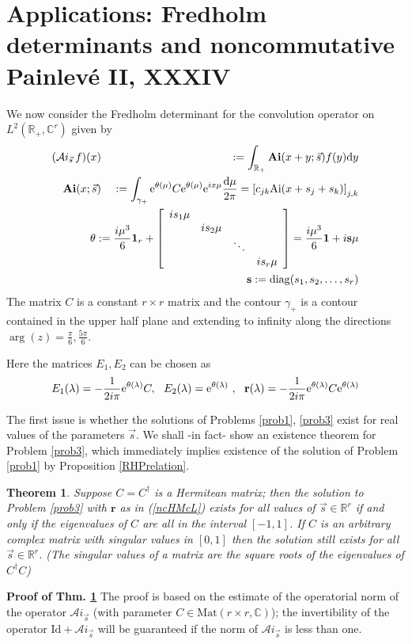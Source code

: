 \documentclass{article}
\def\ss{\mathbf s}
\newtheorem{theorem}{Theorem}[section]
\def\r{ {\mathbf r}}
\def \C{{\mathbf C}}
\def\C{{\mathbb C}}
\def\&{&\hspace{-20pt}}
\def\R{{\mathbb R}}
\def\d{{\rm d}}
\def\1{\mathbf 1}
\def\Id{\mathrm{Id}}
\def\Ai{\mathrm{Ai}}
\def\Ai{\mathrm{Ai}}
\def\Mat{\mathrm{Mat}}
\newcommand{\be}{\begin{eqnarray}}
\newcommand{\ee}{\end{eqnarray}}
\def\le{\left}
\def\ri{\right}
\begin{document}
\section{Applications: Fredholm determinants and noncommutative  Painlev\'e II, XXXIV}
\label{ncAirykernel}
We now consider the Fredholm determinant for the convolution operator on $L^2(\R_+, \C^r)$ given by 
\be
(\mathcal Ai_{\vec s}\,f)(x)&\&  := \int_{\R_+} {\mathbf {Ai}}(x+y;\vec s) f(y)\d y\\
{\bf Ai} (x;\vec s)&\& :=\int_{\gamma_+}  {\rm e}^{\theta(\mu)} C{\rm e}^{\theta(\mu)}{\rm e}^{i x\mu} \frac {\d \mu}{2\pi} = \le[c_{jk} \Ai(x+s_j+s_k)\ri]_{j,k}\\
&\& \theta:=  \frac {i\mu^3}6\1_r  + \le[
\begin{array}{ccccc}
 i s_1 \mu &&&\\
& i s_2 \mu \\
&&\ddots\\
&&& i s_r  \mu 
\end{array}
\ri] = \frac {i\mu^3}6 \1 + i \ss \mu\label{5.3} \\
&& \ss :={\rm diag}(s_1, s_2,\dots,s_r)
\ee
The matrix $C$ is a constant $r\times r$ matrix and the contour $\gamma_+$ is a contour contained in the upper half plane and extending to infinity along the directions $\arg(z) = \frac \pi 6, \frac {5\pi}6$.

Here the matrices $E_1,E_2$ can be chosen as 
\be
E_1(\lambda) =- \frac 1{2i\pi} {\rm e}^{\theta(\lambda)} C ,\ \ E_2(\lambda) = {\rm e}^{\theta(\lambda)}
\ ,\ \ \r(\lambda) = -\frac 1{2i\pi} {\rm e}^{\theta(\lambda)} C {\rm e}^{\theta(\lambda)}
\label{ncHMcL}
\ee

The first issue is whether the solutions of Problems \ref{prob1}, \ref{prob3} exist for real values of the parameters $\vec s$.
We shall -in fact- show an existence theorem for Problem \ref{prob3}, which immediately implies existence of the solution of Problem  \ref{prob1} by Proposition \ref{RHPrelation}.

\begin{shaded}
\begin{theorem}
\label{Xiexists}
Suppose $C=C^\dagger$ is a Hermitean matrix; then the solution to Problem \ref{prob3} with $\r$ as in (\ref{ncHMcL}) exists for all values of $\vec s\in \R^r$ if and only if the eigenvalues of $C$ are all in the interval $[-1,1]$. 
If $C$ is an arbitrary complex matrix with {\em singular values}  in $[0,1]$ then the solution still exists for  all $\vec s\in \R^r$.
(The singular values of a matrix are the square roots of the eigenvalues of $C^\dagger C$)
\end{theorem}
\end{shaded}
{\bf Proof of Thm. \ref{Xiexists}}
The proof is based on the estimate of the operatorial norm of the operator $\mathcal Ai_{\vec s}$ (with parameter $C\in \Mat(r\times r,\C)$); the invertibility of the operator $\Id + \mathcal Ai_{\vec s}$ will be guaranteed if the norm of $\mathcal Ai_{\vec s}$ is less than one.
\end{document}

